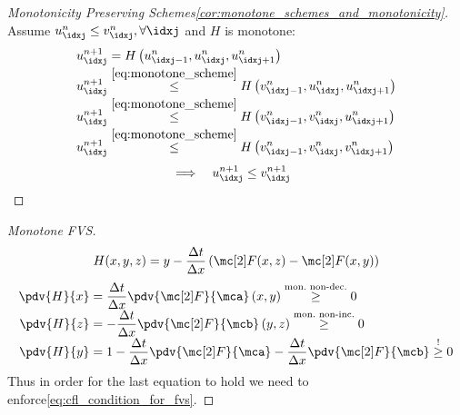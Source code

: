 \begin{proofbox}\nospacing
    \begin{proof}[Monotonicity Preserving Schemes\cref{cor:monotone_schemes_and_monotonicity}]\label{proof:cor:monotone_schemes_and_monotonicity}
        Assume $u_{\idxj}^{n}\leq v_{\idxj}^{n}, \forall\idxj$ and $H$ is monotone:
        \begin{align*}
          u_{\idxj}^{n+1}&=H\left(u_{\idxj-1}^{n},u_{\idxj}^{n},u_{\idxj+1}^{n}\right)\\[-1\jot]
          u_{\idxj}^{n+1}&\stackrel{\cref{eq:monotone_scheme}}{\leq}H\left(v_{\idxj-1}^{n},u_{\idxj}^{n},u_{\idxj+1}^{n}\right)\\[-1\jot]
          u_{\idxj}^{n+1}&\stackrel{\cref{eq:monotone_scheme}}{\leq}H\left(v_{\idxj-1}^{n},v_{\idxj}^{n},u_{\idxj+1}^{n}\right)\\[-1\jot]
          u_{\idxj}^{n+1}&\stackrel{\cref{eq:monotone_scheme}}{\leq}H\left(v_{\idxj-1}^{n},v_{\idxj}^{n},v_{\idxj+1}^{n}\right)
        \end{align*}
        \begin{align*}
          &\implies&&u_{\idxj}^{n+1}\leq v_{\idxj}^{n+1}
        \end{align*}
    \end{proof}
\end{proofbox}
\begin{proofbox}\nospacing
    \begin{proof}[Monotone FVS]\label{proof:cor:monotone_fvm}
        \begin{align*}
          H(x,y,z)=y-\frac{\Delta t}{\Delta x} \left(\Flux(x,z)-\Flux(x,y)\right)
        \end{align*}
        \begin{align*}
          \pdv{H}{x}&=\frac{\Delta t}{\Delta x}\pdv{\Flux}{\mca}\left(x,y\right)\stackrel{\text{mon.\ non-dec.}}{\geq} 0 \\[-1\jot]
          \pdv{H}{z}&=-\frac{\Delta t}{\Delta x}\pdv{\Flux}{\mcb}\left(y,z\right)\stackrel{\text{mon.\ non-inc.}}{\geq} 0 \\[-1\jot]
          \pdv{H}{y}&=1-\frac{\Delta t}{\Delta x}\pdv{\Flux}{\mca}-\frac{\Delta t}{\Delta x}\pdv{\Flux}{\mcb}\stackrel{!}{\geq}0
        \end{align*}
        Thus in order for the last equation to hold we need to enforce\cref{eq:cfl_condition_for_fvs}.
    \end{proof}
\end{proofbox}
